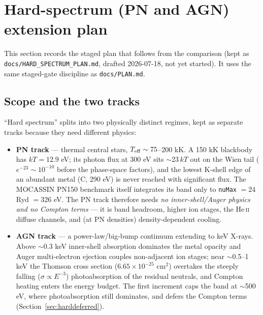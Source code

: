 \documentclass[english,a4paper]{my_memo}
\newcommand{\code}[1]{\texttt{#1}}
\newcommand{\HeII}{He\,\textsc{ii}}
\begin{document}
\section{Hard-spectrum (PN and AGN) extension plan}
\label{sec:hardplan}

This section records the staged plan that follows from the comparison
(kept as \code{docs/HARD\_SPECTRUM\_PLAN.md}, drafted 2026-07-18, not yet
started).  It uses the same staged-gate discipline as \code{docs/PLAN.md}.

\subsection{Scope and the two tracks}

``Hard spectrum'' splits into two physically distinct regimes, kept as
separate tracks because they need different physics:

\begin{itemize}[leftmargin=2em]
\item \textbf{PN track} --- thermal central stars,
  $T_{\rm eff}\sim75$--200 kK.  A 150 kK blackbody has $kT=12.9$ eV; its
  photon flux at 300 eV sits $\sim$23\,$kT$ out on the Wien tail
  ($e^{-23}\sim10^{-10}$ before the phase-space factors), and the lowest
  K-shell edge of an abundant metal (C, 290 eV) is never reached with
  significant flux.  The MOCASSIN PN150 benchmark itself integrates its
  band only to \code{nuMax} $=24$ Ryd $=326$ eV.  The PN track therefore
  needs \emph{no inner-shell/Auger physics and no Compton terms} --- it
  is band headroom, higher ion stages, the \HeII{} diffuse channels, and
  (at PN densities) density-dependent cooling.
\item \textbf{AGN track} --- a power-law/big-bump continuum extending to
  keV X-rays.  Above $\sim$0.3 keV inner-shell absorption dominates the
  metal opacity and Auger multi-electron ejection couples non-adjacent
  ion stages; near $\sim$0.5--1 keV the Thomson cross section
  ($6.65\times10^{-25}$ cm$^2$) overtakes the steeply falling
  ($\sigma\propto E^{-3}$) photoabsorption of the residual neutrals, and
  Compton heating enters the energy budget.  The first increment caps
  the band at $\sim$500 eV, where photoabsorption still dominates, and
  defers the Compton terms (Section~\ref{sec:harddeferred}).
\end{itemize}
\end{document}
